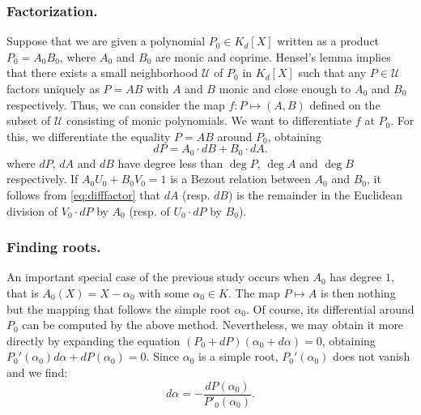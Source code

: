 \documentclass{lms}
\begin{document}
\subsubsection*{Factorization.}

Suppose that we are given a polynomial $P_0 \in K_d[X]$ written as a 
product $P_0 = A_0 B_0$, where $A_0$ and $B_0$ are monic and coprime. 
Hensel's lemma implies that there exists a small neighborhood $\mathcal 
U$ of $P_0$ in $K_d[X]$ such that any $P \in \mathcal U$ factors 
uniquely as $P = A B$ with $A$ and $B$ monic and close enough to $A_0$ 
and $B_0$ respectively. Thus, we can consider the map $f : P 
\mapsto (A,B)$ defined on the subset of $\mathcal U$ consisting of monic 
polynomials. We want to differentiate $f$ at $P_0$. For this, we 
differentiate the equality $P = A B$ around $P_0$, obtaining
\begin{equation}
\label{eq:difffactor}
dP = A_0 \cdot dB + B_0 \cdot dA.
\end{equation}
where $dP$, $dA$ and $dB$ have degree less than $\deg P$, $\deg A$ and 
$\deg B$ respectively. If $A_0 U_0 + B_0 V_0 = 1$ is a Bezout relation
between $A_0$ and $B_0$, it follows from \eqref{eq:difffactor} that
$dA$ (resp. $dB$) is the remainder in the Euclidean division of $V_0
{\cdot} dP$ by $A_0$ (resp. of $U_0 {\cdot} dP$ by $B_0$).

\subsubsection*{Finding roots.}

An important special case of the previous study occurs when $A_0$ has 
degree $1$, that is $A_0(X) = X - \alpha_0$ with some $\alpha_0 \in K$. 
The map $P \mapsto A$ is then nothing but the mapping that 
follows the simple root $\alpha_0$. Of course, its differential around 
$P_0$ can be computed by the above method. Nevertheless, we may
obtain it more directly by expanding the equation $(P_0 + 
dP)(\alpha_0 + d\alpha) = 0$, obtaining
$P_0'(\alpha_0) d\alpha + dP(\alpha_0) = 0$.
Since $\alpha_0$ is a simple root, $P_0'(\alpha_0)$ 
does not vanish and we find:
$$d \alpha = - \frac{dP(\alpha_0)}{P'_0(\alpha_0)}.$$
\end{document}
